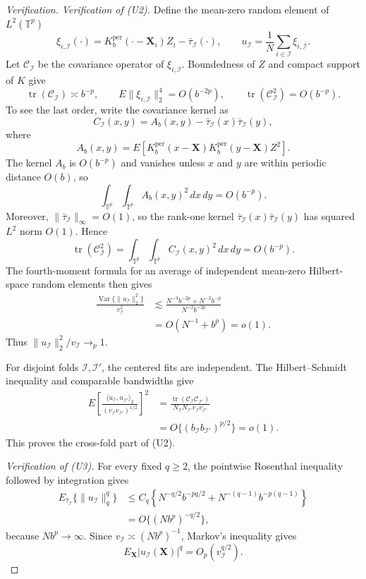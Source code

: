 \documentclass[11pt]{article}
\theoremstyle{referenceplain}
\theoremstyle{referencedefinition}
\theoremstyle{referenceremark}
\begin{document}
\begin{proof}[Verification]
\medskip\noindent\textit{Verification of (U2).}
Define the mean-zero random element of $L^2(\mathbb T^p)$
\[
\xi_{i,\mathcal I}(\cdot)
=K_b^{\mathrm{per}}(\cdot-\mathbf X_i)Z_i
-\bar\tau_{\mathcal I}(\cdot),
\qquad
u_{\mathcal I}=\frac1N\sum_{i\in\mathcal I}\xi_{i,\mathcal I}.
\]
Let $\mathcal C_{\mathcal I}$ be the covariance operator of
$\xi_{i,\mathcal I}$. Boundedness of $Z$ and compact support of $K$ give
\[
\operatorname{tr}(\mathcal C_{\mathcal I})\asymp b^{-p},
\qquad
E\|\xi_{i,\mathcal I}\|_2^4=O(b^{-2p}),
\qquad
\operatorname{tr}(\mathcal C_{\mathcal I}^2)=O(b^{-p}).
\]
To see the last order, write the covariance kernel as
\[
C_{\mathcal I}(x,y)
=A_b(x,y)-\bar\tau_{\mathcal I}(x)\bar\tau_{\mathcal I}(y),
\]
where
\[
A_b(x,y)
=E\left[K_b^{\mathrm{per}}(x-\mathbf X)
K_b^{\mathrm{per}}(y-\mathbf X)Z^2\right].
\]
The kernel $A_b$ is $O(b^{-p})$ and vanishes unless $x$ and $y$ are
within periodic distance $O(b)$, so
\[
\int_{\mathbb T^p}\int_{\mathbb T^p}A_b(x,y)^2\,dx\,dy
=O(b^{-p}).
\]
Moreover, $\|\bar\tau_{\mathcal I}\|_\infty=O(1)$, so the rank-one
kernel $\bar\tau_{\mathcal I}(x)\bar\tau_{\mathcal I}(y)$ has squared
$L^2$ norm $O(1)$. Hence
\[
\operatorname{tr}(\mathcal C_{\mathcal I}^2)
=\int_{\mathbb T^p}\int_{\mathbb T^p}C_{\mathcal I}(x,y)^2\,dx\,dy
=O(b^{-p}).
\]
The fourth-moment formula for an average of independent mean-zero Hilbert-space random elements then gives
\begin{align*}
\frac{\operatorname{Var}\{\|u_{\mathcal I}\|_2^2\}}{v_{\mathcal I}^2}
&\lesssim
\frac{N^{-3}b^{-2p}+N^{-2}b^{-p}}
{N^{-2}b^{-2p}}\\
&=O(N^{-1}+b^p)=o(1).
\end{align*}
Thus $\|u_{\mathcal I}\|_2^2/v_{\mathcal I}\to_p1$.

For disjoint folds $\mathcal I,\mathcal I'$, the centered fits are independent. The Hilbert--Schmidt inequality and comparable bandwidths give
\begin{align*}
E\left[
\frac{\langle u_{\mathcal I},u_{\mathcal I'}\rangle_2}
{(v_{\mathcal I}v_{\mathcal I'})^{1/2}}
\right]^2
&=\frac{\operatorname{tr}(\mathcal C_{\mathcal I}\mathcal C_{\mathcal I'})}
{N_{\mathcal I}N_{\mathcal I'}v_{\mathcal I}v_{\mathcal I'}}\\
&=O\{(b_{\mathcal I}b_{\mathcal I'})^{p/2}\}=o(1).
\end{align*}
This proves the cross-fold part of (U2).

\medskip\noindent\textit{Verification of (U3).}
For every fixed $q\ge2$, the pointwise Rosenthal inequality followed by integration gives
\begin{align*}
E_{\widehat\tau_{\mathcal I}}
\{\|u_{\mathcal I}\|_q^q\}
&\le C_q\left\{
N^{-q/2}b^{-pq/2}
+N^{-(q-1)}b^{-p(q-1)}\right\}\\
&=O\{(Nb^p)^{-q/2}\},
\end{align*}
because $Nb^p\to\infty$. Since
$v_{\mathcal I}\asymp(Nb^p)^{-1}$, Markov's inequality gives
\[
E_{\mathbf X}|u_{\mathcal I}(\mathbf X)|^q
=O_p(v_{\mathcal I}^{q/2}).
\]


\end{proof}
\end{document}
